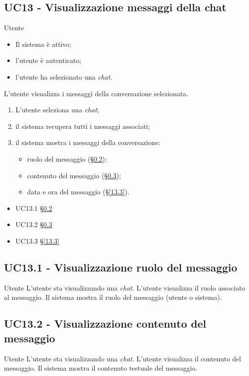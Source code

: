 \subsection{UC13 - Visualizzazione messaggi della chat}
\label{13}
{Utente}
{
    \begin{itemize}
        \item Il sistema è attivo;
        \item l'utente è autenticato;
        \item l'utente ha selezionato una \textit{chat}.
    \end{itemize}
}
{L'utente visualizza i messaggi della conversazione selezionata.}
{
    \begin{enumerate}
        \item L'utente seleziona una \textit{chat};
        \item il sistema recupera tutti i messaggi associati;
        \item il sistema mostra i messaggi della conversazione:
        \begin{itemize}
            \item ruolo del messaggio (§\ref{13.1});
            \item contenuto del messaggio (§\ref{13.2});
            \item data e ora del messaggio (§\ref{13.3}).
        \end{itemize}
    \end{enumerate}
}
{
    \begin{itemize}
        \item UC13.1 §\ref{13.1}
        \item UC13.2 §\ref{13.2}
        \item UC13.3 §\ref{13.3}
    \end{itemize}
}
{}{}{}
\subsection{UC13.1 - Visualizzazione ruolo del messaggio}
\label{13.1}
\makeUC{}
{Utente}
{L'utente sta visualizzando una \textit{chat}.}
{L'utente visualizza il ruolo associato al messaggio.}
{Il sistema mostra il ruolo del messaggio (utente o sistema).}{}{}{}{}
\subsection{UC13.2 - Visualizzazione contenuto del messaggio}
\label{13.2}
\makeUC{}
{Utente}
{L'utente sta visualizzando una \textit{chat}.}
{L'utente visualizza il contenuto del messaggio.}
{Il sistema mostra il contenuto testuale del messaggio.}{}{}{}{}

